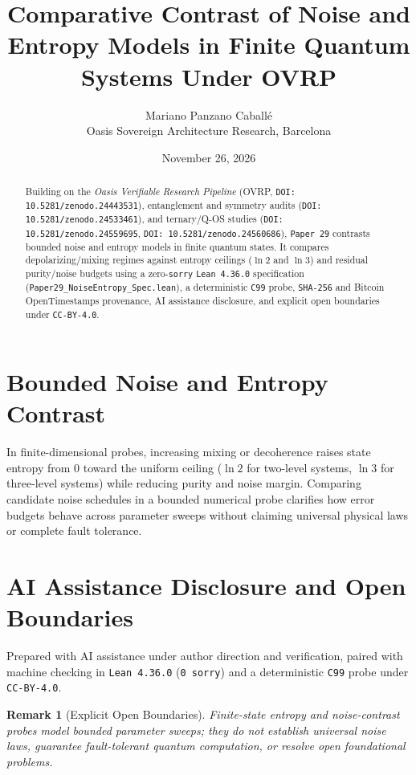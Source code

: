 \documentclass[11pt,a4paper]{article}
\title{Comparative Contrast of Noise and Entropy Models in Finite Quantum Systems Under OVRP}
\author{Mariano Panzano Caball\'e \\ \small Oasis Sovereign Architecture Research, Barcelona}
\date{November 26, 2026}
\newtheorem{remark}{Remark}
\begin{document}
\maketitle

\begin{abstract}
Building on the \emph{Oasis Verifiable Research Pipeline} (OVRP, \texttt{DOI: 10.5281/zenodo.24443531}), entanglement and symmetry audits (\texttt{DOI: 10.5281/zenodo.24533461}), and ternary/Q-OS studies (\texttt{DOI: 10.5281/zenodo.24559695}, \texttt{DOI: 10.5281/zenodo.24560686}), \texttt{Paper~29} contrasts bounded noise and entropy models in finite quantum states. It compares depolarizing/mixing regimes against entropy ceilings ($\ln 2$ and $\ln 3$) and residual purity/noise budgets using a zero-\texttt{sorry} \texttt{Lean~4.36.0} specification (\texttt{Paper29\_NoiseEntropy\_Spec.lean}), a deterministic \texttt{C99} probe, \texttt{SHA-256} and Bitcoin OpenTimestamps provenance, AI assistance disclosure, and explicit open boundaries under \texttt{CC-BY-4.0}.
\end{abstract}

\section{Bounded Noise and Entropy Contrast}
In finite-dimensional probes, increasing mixing or decoherence raises state entropy from $0$ toward the uniform ceiling ($\ln 2$ for two-level systems, $\ln 3$ for three-level systems) while reducing purity and noise margin. Comparing candidate noise schedules in a bounded numerical probe clarifies how error budgets behave across parameter sweeps without claiming universal physical laws or complete fault tolerance.

\section*{AI Assistance Disclosure and Open Boundaries}
Prepared with AI assistance under author direction and verification, paired with machine checking in \texttt{Lean~4.36.0} (\texttt{0~sorry}) and a deterministic \texttt{C99} probe under \texttt{CC-BY-4.0}.

\begin{remark}[Explicit Open Boundaries]
Finite-state entropy and noise-contrast probes model bounded parameter sweeps; they do not establish universal noise laws, guarantee fault-tolerant quantum computation, or resolve open foundational problems.
\end{remark}
\end{document}
